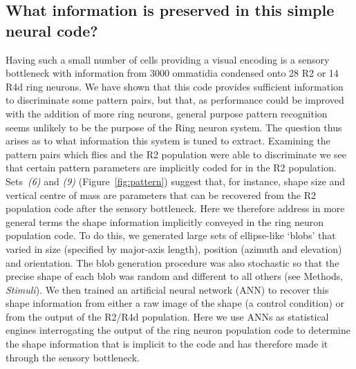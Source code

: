 \documentclass[10pt]{article}
\begin{document}
\subsection*{What information is preserved in this simple neural code?}
Having such a small number of cells providing a visual encoding is a sensory bottleneck with information from 3000 ommatidia condensed onto 28 R2 or 14 R4d ring neurons. We have shown that this code provides sufficient information to discriminate some pattern pairs, but that, as performance could be improved with the addition of more ring neurons, general purpose pattern recognition seems unlikely to be the purpose of the Ring neuron system. The question thus arises as to what information this system is tuned to extract. Examining the pattern pairs which flies and the R2 population were able to discriminate we see that certain pattern parameters are implicitly coded for in the R2 population. Sets~\emph{(6)} and \emph{(9)} (Figure~\ref{fig:pattern}) suggest that, for instance, shape size and vertical centre of mass are parameters that can be recovered from the R2 population code after the sensory bottleneck. 
Here we therefore address in more general terms the shape information implicitly conveyed in the ring neuron population code. To do this, we generated large sets of ellipse-like ‘blobs’  that varied in size (specified by major-axis length), position (azimuth and elevation) and orientation. The blob generation procedure was also stochastic so that the precise shape of each blob was random and different to all others (see Methods, \emph{Stimuli}). We then trained an artificial neural network (ANN) to recover this shape information from either a raw image of the shape (a control condition) or from the output of the R2/R4d population. Here we use ANNs as statistical engines interrogating the output of the ring neuron population code to determine the shape information that is implicit to the code and has therefore made it through the sensory bottleneck. 
\end{document}
